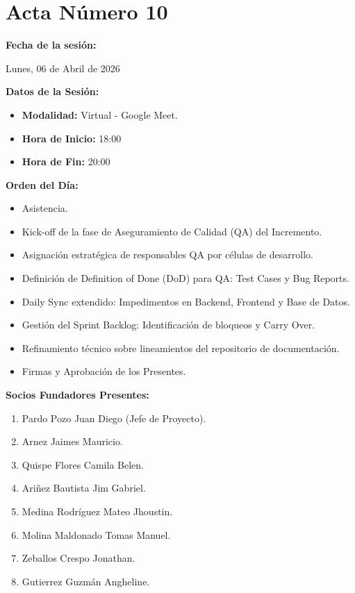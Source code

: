 \newpage
\section{Acta Número 10}
\label{sec:acta10}

\noindent \textbf{Fecha de la sesión:}\par
Lunes, 06 de Abril de 2026

\vspace*{0.5cm}
\noindent \textbf{Datos de la Sesión:}
\vspace{-0.2cm}
\begin{itemize}[noitemsep]
    \item \textbf{Modalidad:} Virtual - Google Meet.
    \item \textbf{Hora de Inicio:} 18:00
    \item \textbf{Hora de Fin:} 20:00
\end{itemize}

\vspace*{0.5cm}
\noindent \textbf{Orden del Día:}
\vspace{-0.2cm}
\begin{itemize}[noitemsep]
    \item Asistencia.
    \item Kick-off de la fase de Aseguramiento de Calidad (QA) del Incremento.
    \item Asignación estratégica de responsables QA por células de desarrollo.
    \item Definición de Definition of Done (DoD) para QA: Test Cases y Bug Reports.
    \item Daily Sync extendido: Impedimentos en Backend, Frontend y Base de Datos.
    \item Gestión del Sprint Backlog: Identificación de bloqueos y Carry Over.
    \item Refinamiento técnico sobre lineamientos del repositorio de documentación.
    \item Firmas y Aprobación de los Presentes.
\end{itemize}

\vspace*{0.5cm}
\noindent \textbf{Socios Fundadores Presentes:}
\vspace{-0.2cm}
\begin{enumerate}[noitemsep]
    \item Pardo Pozo Juan Diego (Jefe de Proyecto).
    \item Arnez Jaimes Mauricio.
    \item Quispe Flores Camila Belen.
    \item Ariñez Bautista Jim Gabriel.
    \item Medina Rodríguez Mateo Jhoustin.
    \item Molina Maldonado Tomas Manuel.
    \item Zeballos Crespo Jonathan.
    \item Gutierrez Guzmán Angheline.
\end{enumerate}

